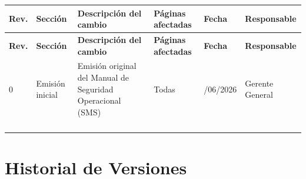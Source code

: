 \begin{longtable}{|>{\centering\arraybackslash}p{1.2cm}|>{\centering\arraybackslash}p{2.1cm}|p{4.2cm}|>{\centering\arraybackslash}p{2.2cm}|>{\centering\arraybackslash}p{1.8cm}|p{2.5cm}|}

\hline

\rowcolor{gray!20}

\textbf{Rev.} &
\textbf{Sección} &
\textbf{Descripción del cambio} &
\textbf{Páginas afectadas} &
\textbf{Fecha} &
\textbf{Responsable}

\\
\hline
\endfirsthead

\hline

\rowcolor{gray!20}

\textbf{Rev.} &
\textbf{Sección} &
\textbf{Descripción del cambio} &
\textbf{Páginas afectadas} &
\textbf{Fecha} &
\textbf{Responsable}

\\
\hline

\endhead

0 &
Emisión inicial &
Emisión original del Manual de Seguridad Operacional (SMS) &
Todas &
23/06/2026 &
Gerente General

\\
\hline

&
&
&
&
&
\\
\hline

&
&
&
&
&
\\
\hline

&
&
&
&
&
\\
\hline

&
&
&
&
&
\\
\hline

\end{longtable}

\vspace{0.7cm}


\section*{Historial de Versiones}

\renewcommand{\arraystretch}{1.35}

